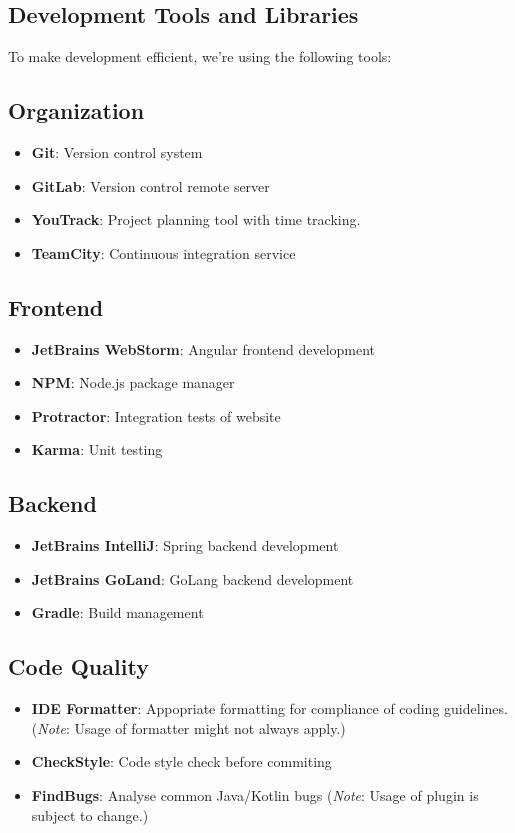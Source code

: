 \documentclass[a4paper,12pt,chapterprefix=false,bibliography=totoc,listof=totoc,]{scrreprt}
\begin{document}
\subsection{Development Tools and Libraries}
To make development efficient, we're using the following tools:

\subsection*{Organization}
\begin{itemize}
	\item \textbf{Git}: Version control system
	\item \textbf{GitLab}: Version control remote server
    \item \textbf{YouTrack}: Project planning tool with time tracking.
	\item \textbf{TeamCity}: Continuous integration service	
\end{itemize}

\subsection*{Frontend}
\begin{itemize}
    \item \textbf{JetBrains WebStorm}: Angular frontend development
	\item \textbf{NPM}: Node.js package manager
	\item \textbf{Protractor}: Integration tests of website
	\item \textbf{Karma}: Unit testing
\end{itemize}

\subsection*{Backend}
\begin{itemize}
	\item \textbf{JetBrains IntelliJ}: Spring backend development
	\item \textbf{JetBrains GoLand}: GoLang backend development
	\item \textbf{Gradle}: Build management
\end{itemize}

\subsection*{Code Quality}
\begin{itemize}
	\item \textbf{IDE Formatter}: Appopriate formatting for compliance of coding guidelines. (\textit{Note}: Usage of formatter might not always apply.)
	\item \textbf{CheckStyle}: Code style check before commiting
	\item \textbf{FindBugs}: Analyse common Java/Kotlin bugs 
	(\textit{Note}: Usage of plugin is subject to change.)
\end{itemize}
\end{document}
